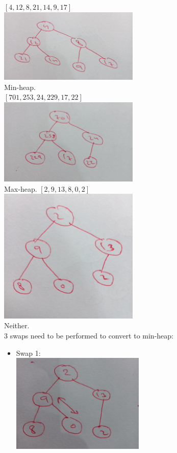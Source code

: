 \documentclass[12pt,twoside]{article}
\begin{document}
\begin{problems}
\newpage
\problem  %
\begin{problemparts}
\problempart %
$[4, 12, 8, 21, 14, 9, 17]$ \\
\includegraphics[width=0.5\textwidth]{2a.jpg} \\
Min-heap. \\
\problempart %
$[701, 253, 24, 229, 17, 22]$ \\
\includegraphics[width=0.5\textwidth]{2b.jpg} \\
Max-heap.
\newpage
\problempart %
$[2, 9, 13, 8, 0, 2]$ \\
\includegraphics[width=0.5\textwidth]{2c.jpg} \\
Neither. \\
3 swaps need to be performed to convert to min-heap:
\begin{itemize}
    \item Swap 1: \\
    \includegraphics[width=0.5\textwidth]{2c1.jpg}

\end{itemize}
\end{problemparts}
\end{problems}
\end{document}
